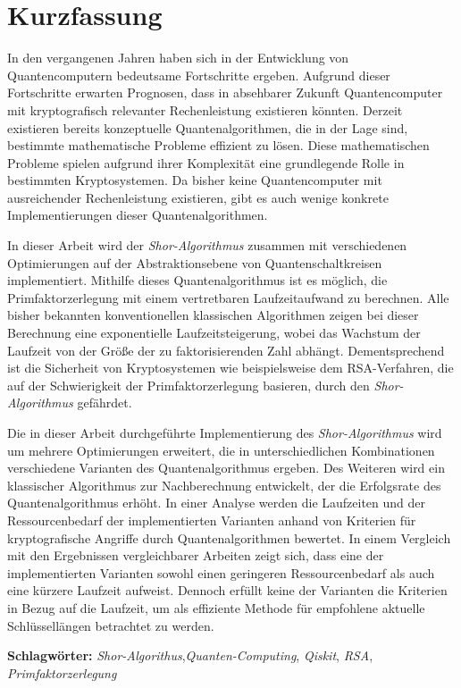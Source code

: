 
\section*{Kurzfassung}
In den vergangenen Jahren haben sich in der Entwicklung von Quantencomputern bedeutsame Fortschritte ergeben.
Aufgrund dieser Fortschritte erwarten Prognosen, 
dass in absehbarer Zukunft Quantencomputer mit kryptografisch relevanter Rechenleistung existieren könnten. 
Derzeit existieren bereits konzeptuelle Quantenalgorithmen, die in der Lage sind, 
bestimmte mathematische Probleme effizient zu lösen. 
Diese mathematischen Probleme spielen aufgrund ihrer Komplexität eine grundlegende Rolle in bestimmten Kryptosystemen. 
Da bisher keine Quantencomputer mit ausreichender Rechenleistung existieren, 
gibt es auch wenige konkrete Implementierungen dieser Quantenalgorithmen.

In dieser Arbeit wird der \textit{Shor-Algorithmus} zusammen mit verschiedenen Optimierungen 
auf der Abstraktionsebene von Quantenschaltkreisen implementiert.
Mithilfe dieses Quantenalgorithmus ist es möglich, 
die Primfaktorzerlegung mit einem vertretbaren Laufzeitaufwand zu berechnen. 
Alle bisher bekannten konventionellen klassischen Algorithmen zeigen bei dieser Berechnung eine exponentielle Laufzeitsteigerung, 
wobei das Wachstum der Laufzeit von der Größe der zu faktorisierenden Zahl abhängt.
Dementsprechend ist die Sicherheit von Kryptosystemen wie beispielsweise dem RSA-Verfahren, 
die auf der Schwierigkeit der Primfaktorzerlegung basieren, 
durch den \textit{Shor-Algorithmus} gefährdet.

Die in dieser Arbeit durchgeführte Implementierung des \textit{Shor-Algorithmus} 
wird um mehrere Optimierungen erweitert, 
die in unterschiedlichen Kombinationen verschiedene Varianten des Quantenalgorithmus ergeben.  
Des Weiteren wird ein klassischer Algorithmus zur Nachberechnung entwickelt, 
der die Erfolgsrate des Quantenalgorithmus erhöht. 
In einer Analyse werden die Laufzeiten und 
der Ressourcenbedarf der implementierten Varianten anhand von Kriterien für kryptografische Angriffe durch Quantenalgorithmen bewertet.
In einem Vergleich mit den Ergebnissen vergleichbarer Arbeiten zeigt sich, 
dass eine der implementierten Varianten sowohl einen geringeren Ressourcenbedarf als auch eine kürzere Laufzeit aufweist. 
Dennoch erfüllt keine der Varianten die Kriterien in Bezug auf die Laufzeit, 
um als effiziente Methode für empfohlene aktuelle Schlüssellängen betrachtet zu werden.

\bigbreak
\noindent
\textbf{Schlagwörter:} \textit{Shor-Algorithus},\textit{Quanten-Computing}, \textit{Qiskit}, \textit{RSA}, \textit{Primfaktorzerlegung}

